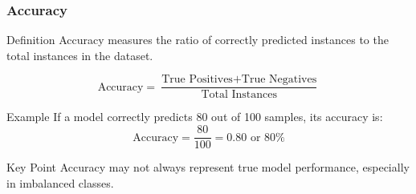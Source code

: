 \documentclass[aspectratio=169]{beamer}
\begin{document}
\begin{frame}[fragile]
    \frametitle{Accuracy}
    \begin{block}{Definition}
    Accuracy measures the ratio of correctly predicted instances to the total instances in the dataset.
    \end{block}
    \begin{equation}
        \text{Accuracy} = \frac{\text{True Positives} + \text{True Negatives}}{\text{Total Instances}}
    \end{equation}
    
    \begin{block}{Example}
    If a model correctly predicts 80 out of 100 samples, its accuracy is:
    \begin{equation}
        \text{Accuracy} = \frac{80}{100} = 0.80 \text{ or } 80\%
    \end{equation}
    \end{block}
    
    \begin{block}{Key Point}
    Accuracy may not always represent true model performance, especially in imbalanced classes.
    \end{block}
\end{frame}
\end{document}
